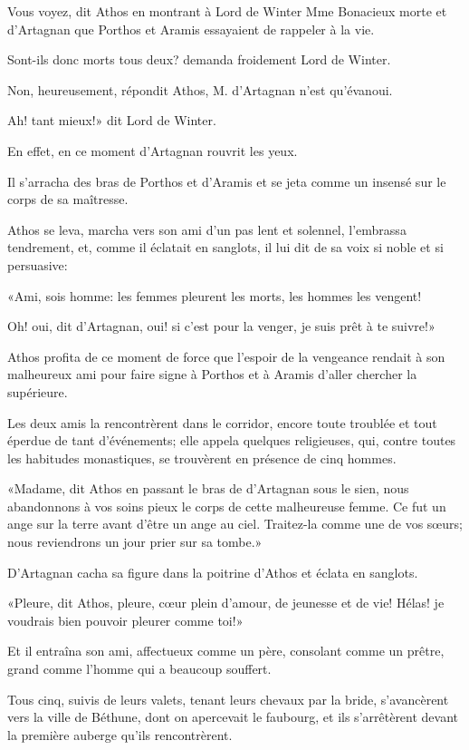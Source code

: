 \speak  Vous voyez, dit Athos en montrant à Lord de Winter Mme Bonacieux morte et d'Artagnan que Porthos et Aramis essayaient de rappeler à la vie. 

\speak  Sont-ils donc morts tous deux? demanda froidement Lord de Winter. 

\speak  Non, heureusement, répondit Athos, M. d'Artagnan n'est qu'évanoui. 

\speak  Ah! tant mieux!» dit Lord de Winter. 

En effet, en ce moment d'Artagnan rouvrit les yeux. 

Il s'arracha des bras de Porthos et d'Aramis et se jeta comme un insensé sur le corps de sa maîtresse. 

Athos se leva, marcha vers son ami d'un pas lent et solennel, l'embrassa tendrement, et, comme il éclatait en sanglots, il lui dit de sa voix si noble et si persuasive: 

«Ami, sois homme: les femmes pleurent les morts, les hommes les vengent! 

\speak  Oh! oui, dit d'Artagnan, oui! si c'est pour la venger, je suis prêt à te suivre!» 

Athos profita de ce moment de force que l'espoir de la vengeance rendait à son malheureux ami pour faire signe à Porthos et à Aramis d'aller chercher la supérieure. 

Les deux amis la rencontrèrent dans le corridor, encore toute troublée et tout éperdue de tant d'événements; elle appela quelques religieuses, qui, contre toutes les habitudes monastiques, se trouvèrent en présence de cinq hommes. 

«Madame, dit Athos en passant le bras de d'Artagnan sous le sien, nous abandonnons à vos soins pieux le corps de cette malheureuse femme. Ce fut un ange sur la terre avant d'être un ange au ciel. Traitez-la comme une de vos sœurs; nous reviendrons un jour prier sur sa tombe.» 

D'Artagnan cacha sa figure dans la poitrine d'Athos et éclata en sanglots. 

«Pleure, dit Athos, pleure, cœur plein d'amour, de jeunesse et de vie! Hélas! je voudrais bien pouvoir pleurer comme toi!» 

Et il entraîna son ami, affectueux comme un père, consolant comme un prêtre, grand comme l'homme qui a beaucoup souffert. 

Tous cinq, suivis de leurs valets, tenant leurs chevaux par la bride, s'avancèrent vers la ville de Béthune, dont on apercevait le faubourg, et ils s'arrêtèrent devant la première auberge qu'ils rencontrèrent. 

